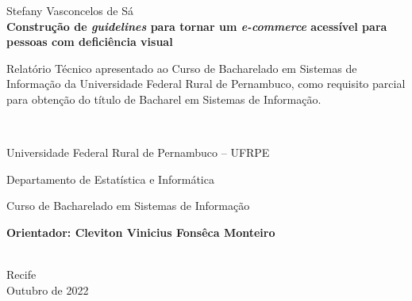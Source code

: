 \begin{titlepage}
%

{\center
{\large Stefany Vasconcelos de Sá}\\[3cm]
{\Large \bf Construção de \textit{guidelines} para tornar um \textit{e-commerce} acessível para pessoas com deficiência visual}\\[2.0cm]


{\raggedleft
\begin{minipage}[t]{8.3cm}
\setlength{\baselineskip}{0.25in}
Relatório Técnico apresentado ao Curso de Bacharelado em Sistemas de Informação da Universidade Federal Rural de Pernambuco, como requisito parcial para obtenção do título de Bacharel em Sistemas de Informação.
\end{minipage}\\[2cm]}

\begin{center}
	Universidade Federal Rural de Pernambuco -- UFRPE
  	\par
  	Departamento de Estatística e Informática
    \par
  	Curso de Bacharelado em Sistemas de Informação
\end{center}

\vspace{3cm}
{\large \bf{Orientador:} Cleviton Vinicius Fonsêca Monteiro}}\\[2.0cm]

\vspace{2cm}
{\center Recife \\[2mm]
Outubro de 2022 \\}






\end{titlepage}